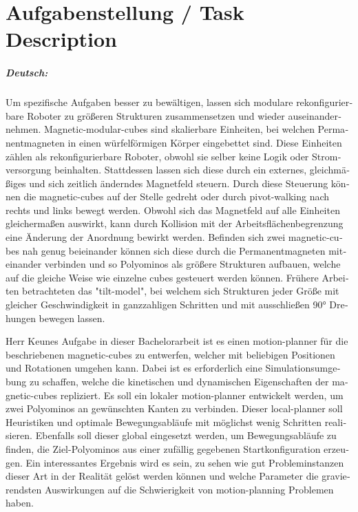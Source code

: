 \documentclass[11pt,a4paper,twoside,titlepage]{scrbook}
\theoremstyle{definition}
\begin{document}
	
	\chapter*{Aufgabenstellung / Task Description}


\paragraph{Deutsch:}
\begin{otherlanguage}{ngerman}
Um spezifische Aufgaben besser zu bewältigen, lassen sich modulare rekonfigurierbare Roboter zu größeren Strukturen zusammensetzen und wieder auseinandernehmen.
Magnetic-modular-cubes sind skalierbare Einheiten, bei welchen Permanentmagneten in einen würfelförmigen Körper eingebettet sind.
Diese Einheiten zählen als rekonfigurierbare Roboter, obwohl sie selber keine Logik oder Stromversorgung beinhalten.
Stattdessen lassen sich diese durch ein externes, gleichmäßiges und sich zeitlich änderndes Magnetfeld steuern.
Durch diese Steuerung können die magnetic-cubes auf der Stelle gedreht oder durch pivot-walking nach rechts und links bewegt werden.
Obwohl sich das Magnetfeld auf alle Einheiten gleichermaßen auswirkt, kann durch Kollision mit der Arbeitsflächenbegrenzung eine Änderung der Anordnung bewirkt werden.
Befinden sich zwei magnetic-cubes nah genug beieinander können sich diese durch die Permanentmagneten miteinander verbinden und so Polyominos als größere Strukturen aufbauen,
welche auf die gleiche Weise wie einzelne cubes gesteuert werden können.
Frühere Arbeiten betrachteten das "tilt-model", bei welchem sich Strukturen jeder Größe mit gleicher Geschwindigkeit in ganzzahligen Schritten und mit ausschließen 90° Drehungen bewegen lassen.

Herr Keunes Aufgabe in dieser Bachelorarbeit ist es einen motion-planner für die beschriebenen magnetic-cubes zu entwerfen, welcher mit beliebigen Positionen und Rotationen umgehen kann.
Dabei ist es erforderlich eine Simulationsumgebung zu schaffen, welche die kinetischen und dynamischen Eigenschaften der magnetic-cubes repliziert.
Es soll ein lokaler motion-planner entwickelt werden, um zwei Polyominos an gewünschten Kanten zu verbinden.
Dieser local-planner soll Heuristiken und optimale Bewegungsabläufe mit möglichst wenig Schritten realisieren.
Ebenfalls soll dieser global eingesetzt werden, um Bewegungsabläufe zu finden, die Ziel-Polyominos aus einer zufällig gegebenen Startkonfiguration erzeugen.
Ein interessantes Ergebnis wird es sein, zu sehen wie gut Probleminstanzen dieser Art in der Realität gelöst werden können und welche Parameter die gravierendsten Auswirkungen auf die Schwierigkeit von motion-planning Problemen haben. 

\end{otherlanguage}
\end{document}
